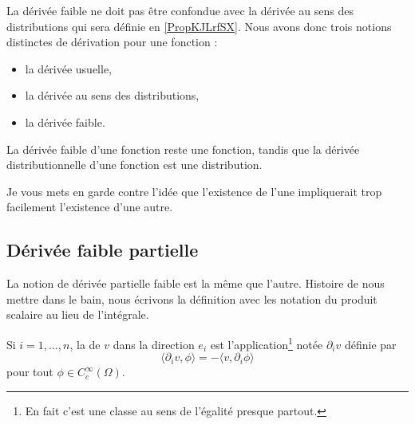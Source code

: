 \begin{remark}      \label{REMooBGJFooPBkFqm}
    La dérivée faible ne doit pas être confondue avec la dérivée au sens des distributions qui sera définie en \ref{PropKJLrfSX}. Nous avons donc trois notions distinctes de dérivation pour une fonction :
    \begin{itemize}
        \item la dérivée usuelle,
        \item la dérivée au sens des distributions,
        \item la dérivée faible.
    \end{itemize}
    La dérivée faible d'une fonction reste une fonction, tandis que la dérivée distributionnelle d'une fonction est une distribution.

    Je vous mets en garde contre l'idée que l'existence de l'une impliquerait trop facilement l'existence d'une autre.
\end{remark}

\subsection{Dérivée faible partielle}

La notion de dérivée partielle faible est la même que l'autre. Histoire de nous mettre dans le bain, nous écrivons la définition avec les notation du produit scalaire au lieu de l'intégrale.

\begin{definition}      \label{DEFooBRFCooPncSCE}
    Si \( i=1,\ldots, n\), la  de \( v\) dans la direction \( e_i\) est l'application\footnote{En fait c'est une classe au sens de l'égalité presque partout.} notée \( \partial_iv\) définie par
    \begin{equation}        \label{EQooMRZUooFoqPqv}
        \langle \partial_iv, \phi\rangle =-\langle v, \partial_i\phi\rangle
    \end{equation}
    pour tout \( \phi\in  C^{\infty}_c(\Omega)\).
\end{definition}

